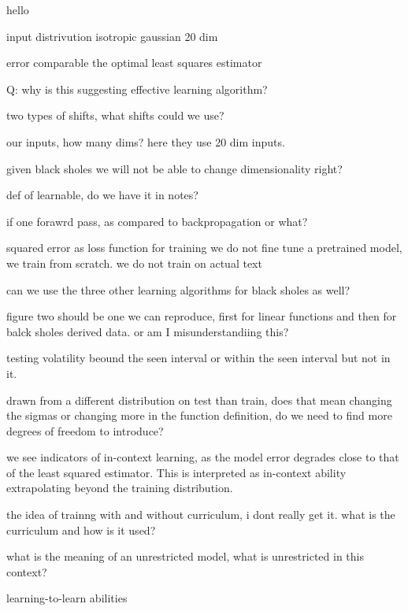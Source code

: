 
hello

input distrivution isotropic gaussian 20 dim

error comparable the optimal least squares estimator

Q: why is this suggesting effective learning algorithm?

two types of shifts, what shifts could we use?

our inputs, how many dims? here they use 20 dim inputs. 

given black sholes we will not be able to change dimensionality right?

def of learnable, do we have it in notes?

if one forawrd pass, as compared to backpropagation or what? 

squared error as loss function for training
we do not fine tune a pretrained model, we train from scratch. we do not train on actual text

can we use the three other learning algorithms for black sholes as well?

figure two should be one we can reproduce, first for linear functions and then for balck sholes derived data. or am I misunderstandiing this?

testing volatility beound the seen interval or within the seen interval but not in it. 

drawn from a different distribution on test than train, does that mean changing the sigmas or changing more in the function definition, do we need to find more degrees of freedom to introduce?

we see indicators of in-context learning, as the model error degrades close to that of the least squared estimator. This is interpreted as in-context ability extrapolating beyond the training distribution. 

the idea of trainng with and without curriculum, i dont really get it. what is the curriculum and how is it used?

what is the meaning of an unrestricted model, what is unrestricted in this context?

learning-to-learn abilities

